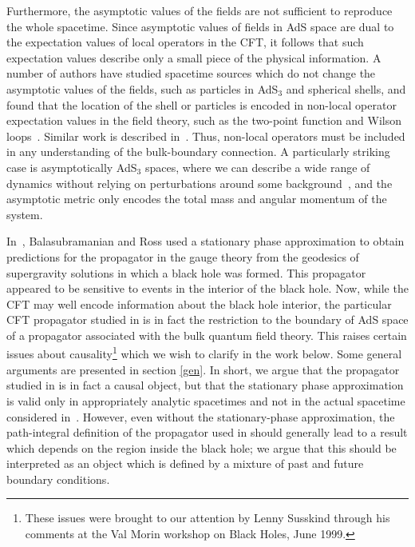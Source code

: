 \documentclass[a4paper,12pt]{article}
\begin{document}
Furthermore, the asymptotic values of the fields are not sufficient to
reproduce the whole spacetime.  Since asymptotic values of fields in
AdS space are dual to the expectation values of local operators in the
CFT, it follows that such expectation values describe only a small
piece of the physical information.  A number of authors have studied
spacetime sources which do not change the asymptotic values of the
fields, such as particles in AdS$_3$ and spherical shells, and found
that the location of the shell or particles is encoded in non-local
operator expectation values in the field theory, such as the two-point
function and Wilson
loops~\cite{holopart,sfsg:shell,dan:shell,chep:shell}. Similar work is
described in~\cite{suss:loop}. Thus, non-local operators must be
included in any understanding of the bulk-boundary connection. A
particularly striking case is asymptotically AdS$_3$ spaces, where we
can describe a wide range of dynamics without relying on perturbations
around some background~\cite{matschull,holst-matschull}, and the
asymptotic metric only encodes the total mass and angular momentum of
the system.

In~\cite{holopart}, Balasubramanian and Ross used a stationary phase
approximation to obtain predictions for the propagator in the gauge
theory from the geodesics of supergravity solutions in which a black
hole was formed.  This propagator appeared to be sensitive to events
in the interior of the black hole.  Now, while the CFT may well encode
information about the black hole interior, the particular CFT
propagator studied in \cite{holopart} is in fact the restriction to
the boundary of AdS space of a propagator associated with the bulk
quantum field theory.  This raises certain issues about
causality\footnote{These issues were brought to our attention by Lenny
Susskind through his comments at the Val Morin workshop on Black
Holes, June 1999.} which we wish to clarify in the work below.  Some
general arguments are presented in section \ref{gen}.  In short, we
argue that the propagator studied in \cite{holopart} is in fact a
causal object, but that the stationary phase approximation is valid
only in appropriately analytic spacetimes and not in the actual
spacetime considered in~\cite{holopart}. However, even without the
stationary-phase approximation, the path-integral definition of the
propagator used in \cite{holopart} should generally lead to a result
which depends on the region inside the black hole; we argue that this
should be interpreted as an object which is defined by a mixture of
past and future boundary conditions.
\end{document}
